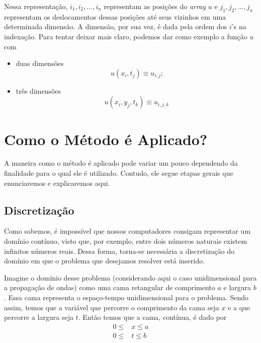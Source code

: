             Nessa representação, $i_1, i_2, ..., i_n$ representam as posições do \textit{array} $u$ e $j_1, j_2, ..., j_n$ representam os deslocamentos dessas posições até seus vizinhos em uma determinada dimensão. A dimensão, por sua vez, é dada pela ordem dos $i$'s na indexação. Para tentar deixar mais claro, podemos dar como exemplo a função $u$ com  \cite{notasAulas2017}
            \begin{itemize}
                \item duas dimensões
                \begin{equation}
                    u(x_i, t_j) \equiv u_{i, j}\text{;} 
                \end{equation}
                \item três dimensões
                \begin{equation}
                    u(x_i, y_j, t_k) \equiv u_{i, j, k}
                \end{equation}
            \end{itemize}
            
        \section{Como o Método é Aplicado?}
        
            A maneira como o método é aplicado pode variar um pouco dependendo da finalidade para o qual ele é utilizado. Contudo, ele segue etapas gerais que enunciaremos e explicaremos aqui.
            
            \subsection{Discretização}
            
                Como sabemos, é impossível que nossos computadores consigam representar um domínio contínuo, visto que, por exemplo, entre dois números naturais existem infinitos números reais. Dessa forma, torna-se necessária a discretização do domínio em que o problema que desejamos resolver está inserido.
                
                Imagine o domínio desse problema (considerando aqui o caso unidimensional para a propagação de ondas) como uma cama retangular de comprimento $a$ e largura $b$. Essa cama representa o espaço-tempo unidimensional para o problema. Sendo assim, temos que a variável que percorre o comprimento da cama seja $x$ e a que percorre a largura seja $t$. Então temos que a cama, contínua, é dado por 
                \begin{align*}
                    0 \leq  &x \leq a\\
                    0 \leq  &t \leq b
                \end{align*}
                
